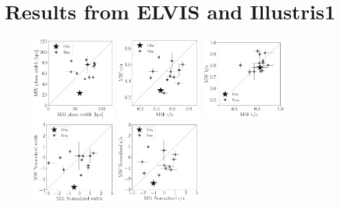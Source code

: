 \documentclass[a4paper,fleqn,usenatbib]{mnras}
\begin{document}
\section{Results from ELVIS and Illustris1}
\begin{figure}
\centering
\includegraphics[width=0.28\textwidth]{scatter_ranked_elvis_width.pdf}
\includegraphics[width=0.28\textwidth]{scatter_ranked_elvis_ca_ratio.pdf}
\includegraphics[width=0.28\textwidth]{scatter_ranked_elvis_ba_ratio.pdf}
\includegraphics[width=0.28\textwidth]{scatter_norm_ranked_elvis_width.pdf}
\includegraphics[width=0.28\textwidth]{scatter_norm_ranked_elvis_ca_ratio.pdf}

\end{figure}
\end{document}
